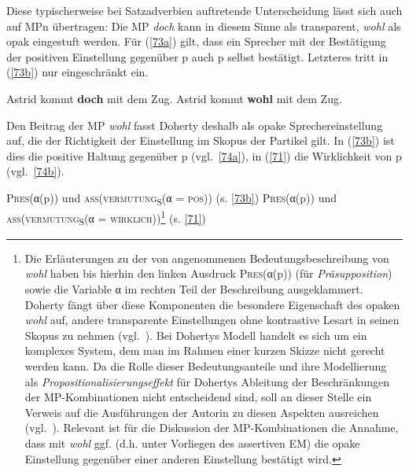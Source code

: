 Diese typischerweise bei Satzadverbien auftretende Unterscheidung lässt sich auch auf MPn übertragen: Die MP \textit{doch} kann in diesem Sinne als transparent, \textit{wohl} als opak eingestuft werden. Für (\ref{73a}) gilt, dass ein Sprecher mit der Bestätigung der positiven Einstellung gegenüber p auch p selbst bestätigt. Letzteres tritt in (\ref{73b}) nur eingeschränkt ein.
\begin{exe}
	\ex\label{73} 
		\begin{xlist}	
			\ex\label{73a} Astrid kommt \textbf{doch} mit dem Zug.
			\ex\label{73b} Astrid kommt \textbf{wohl} mit dem Zug.
		\end{xlist}
\end{exe}
Den Beitrag der MP \textit{wohl} fasst Doherty deshalb als opake Sprechereinstellung auf, die der Richtigkeit der Einstellung im Skopus der Partikel gilt. In (\ref{73b}) ist dies die positive Haltung gegenüber p (vgl.\ \ref{74a}), in (\ref{71}) die Wirklichkeit von p (vgl.\ \ref{74b}).\pagebreak
\begin{exe}
	\ex\label{74} 
		\begin{xlist}	
			\ex\label{74a} \textsc{Pres}(α(\textrm{p})) \textrm{und \textsc{ass}(\textsc{vermutung}}\textsubscript{\textrm{S}}(α = \textrm{\textsc{pos}}))	(s. \ref{73b})
			\ex\label{74b} \textsc{Pres}(α(\textrm{p})) \textrm{und \textsc{ass}(\textsc{vermutung}}\textsubscript{\textrm{S}}(α = \textrm{\textsc{wirklich}}))\footnote{Die Erläuterungen zu der von \citet{Doherty1985} angenommenen Bedeutungsbeschreibung von \textit{wohl} haben bis hierhin den linken Ausdruck \textsc{Pres}(α(p)) (für \textit{Präsupposition}) sowie die Variable α im rechten Teil der Beschreibung ausgeklammert. Doherty fängt über diese Komponenten die besondere Eigenschaft des opaken \textit{wohl} auf, andere transparente Einstellungen ohne kontrastive Lesart in seinen Skopus zu nehmen (vgl.\ \citet[40--54]{Doherty1985}). Bei Dohertys Modell handelt es sich um ein komplexes System, dem man im Rahmen einer kurzen Skizze nicht gerecht werden kann. Da die Rolle dieser Bedeutungsanteile und ihre Modellierung als \textit{Propositionalisierungseffekt} für Dohertys Ableitung der Beschränkungen der MP-Kom\-bi\-na\-ti\-on\-en nicht entscheidend sind, soll an dieser Stelle ein Verweis auf die Ausführungen der Autorin zu diesen Aspekten ausreichen (vgl.\ \citealt[81--82]{Doherty1985}). Relevant ist für die Diskussion der MP-Kom\-bi\-na\-ti\-on\-en die Annahme, dass mit \textit{wohl} ggf. (d.h. unter Vorliegen des assertiven EM) die opake Einstellung gegenüber einer anderen Einstellung bestätigt wird.} (s. \ref{71})
\end{xlist}
\end{exe}

